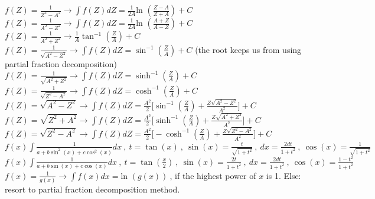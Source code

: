 \documentclass[12pt]{article}
\def\ln{\text{ln\ }} %
\begin{document}
\begin{flushleft}
	\textbullet \quad $\displaystyle f(Z) = \frac{1}{Z^2 -A^2} \rightarrow \int f(Z) dZ = \frac{1}{2A} \ln \left(\frac{Z-A}{Z+A} \right) + C$ \linebreak 
	\textbullet \quad $\displaystyle f(Z) = \frac{1}{A^2 -Z^2} \rightarrow \int f(Z) dZ = \frac{1}{2A} \ln \left(\frac{A+Z}{A-Z} \right) + C$ \linebreak 
	\textbullet \quad $\displaystyle f(Z) = \frac{1}{A^2 + Z^2} \rightarrow \frac{1}{A} \tan^{-1} \left( \frac{Z}{A} \right) + C$ \linebreak 
	\textbullet \quad $\displaystyle f(Z) = \frac{1}{\sqrt{A^2 -Z^2}} \rightarrow \int f(Z) dZ = \sin ^{-1} \left( \frac{Z}{A} \right) + C$ (the root keeps us from using partial fraction decomposition) \linebreak 
	\textbullet \quad $\displaystyle f(Z) = \frac{1}{\sqrt{A^2 +Z^2}} \rightarrow \int f(Z) dZ = \sinh ^{-1} \left( \frac{Z}{A} \right) + C$ \linebreak 
	\textbullet \quad $\displaystyle f(Z) = \frac{1}{\sqrt{Z^2 -A^2}} \rightarrow \int f(Z) dZ = \cosh ^{-1} \left( \frac{Z}{A} \right) + C$ \linebreak 
	\textbullet \quad $\displaystyle f(Z) = \sqrt{A^2-Z^2} \rightarrow \int f(Z) dZ = \frac{A^2}{2} \big[ \sin ^{-1} \left( \frac{Z}{A} \right) + \frac{Z\sqrt{A^2 -Z^2}}{A^2} \big] + C$ \linebreak 
	\textbullet \quad $\displaystyle f(Z) = \sqrt{Z^2+A^2} \rightarrow \int f(Z) dZ = \frac{A^2}{2} \big[ \sinh ^{-1} \left( \frac{Z}{A} \right) + \frac{Z\sqrt{A^2 +Z^2}}{A^2} \big] + C$ \linebreak 
	\textbullet \quad $\displaystyle f(Z) = \sqrt{Z^2-A^2} \rightarrow \int f(Z) dZ = \frac{A^2}{2} \big[ -\cosh ^{-1} \left( \frac{Z}{A} \right) + \frac{Z\sqrt{Z^2 -A^2}}{A^2} \big] + C$ \linebreak 
	\textbullet \quad $\displaystyle f(x) \int \frac{1}{a+b\sin ^2(x) + c\cos ^2(x)} dx\ , \ t=\tan (x)\ , \ \sin (x) =\frac{t}{\sqrt{1+t^2}} \ , \ dx= \frac{2dt}{1+t^2} \ , \ \cos (x) = \frac{1}{\sqrt{1+t^2}} $ \linebreak 
	\textbullet \quad $\displaystyle f(x) \int \frac{1}{a+b\sin (x) + c \cos (x)} dx\ , \ t=\tan (\frac{x}{2})\ , \ \sin (x) =\frac{2t}{1+t^2} \ , \ dx= \frac{2dt}{1+t^2} \ , \ \cos (x) = \frac{1-t^2}{1+t^2} $ \linebreak 
	\textbullet \quad $\displaystyle f(x) = \frac{1}{g(x)} \rightarrow \int f(x) dx = \ln(g(x)) \ $, if the highest power of $x$ is 1. Else: resort to partial fraction decomposition method. \linebreak 

\end{flushleft}
\end{document}
